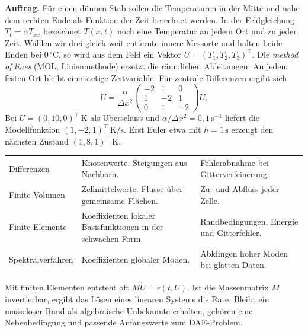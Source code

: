 \textbf{Auftrag.} Für einen dünnen Stab sollen die Temperaturen in der Mitte und nahe dem rechten Ende als Funktion der Zeit berechnet werden. In der Feldgleichung \(T_t=\alpha T_{xx}\) bezeichnet \(T(x,t)\) noch eine Temperatur an jedem Ort und zu jeder Zeit.
Wählen wir drei gleich weit entfernte innere Messorte und halten beide Enden bei \(0\,^{\circ}\mathrm C\), so wird aus dem Feld ein Vektor \(U=(T_1,T_2,T_3)^\top\). Die \emph{method of lines} (MOL, Linienmethode) ersetzt die räumlichen Ableitungen. An jedem festen Ort bleibt eine stetige Zeitvariable. Für zentrale Differenzen ergibt sich
\[
 \dot U=\frac{\alpha}{\Delta x^2}
 \begin{pmatrix}-2&1&0\\1&-2&1\\0&1&-2\end{pmatrix}U.
\]
Bei \(U=(0,10,0)^\top\,\mathrm K\) als Überschuss und \(\alpha/\Delta x^2=0{,}1\,\mathrm{s}^{-1}\) liefert die Modellfunktion \((1,-2,1)^\top\,\mathrm{K/s}\). Erst Euler etwa mit \(h=1\,\mathrm s\) erzeugt den nächsten Zustand \((1,8,1)^\top\,\mathrm K\).
{\tblstart\begin{tabularx}{\linewidth}{@{}P{27mm}YY@{}}\toprule
{}&&\\\midrule
Differenzen&Knotenwerte. Steigungen aus Nachbarn.&Fehlerabnahme bei Gitterverfeinerung.\\
Finite Volumen&Zellmittelwerte. Flüsse über gemeinsame Flächen.&Zu- und Abfluss jeder Zelle.\\
Finite Elemente&Koeffizienten lokaler Basisfunktionen in der schwachen Form.&Randbedingungen, Energie und Gitterfehler.\\
Spektralverfahren&Koeffizienten globaler Moden.&Abklingen hoher Moden bei glatten Daten.\\\bottomrule
\end{tabularx}\par}
Mit finiten Elementen entsteht oft \(M\dot U=r(t,U)\). Ist die Massenmatrix \(M\) invertierbar, ergibt das Lösen eines linearen Systems die Rate. Bleibt ein masseloser Rand als algebraische Unbekannte erhalten, gehören eine Nebenbedingung und passende Anfangswerte zum DAE-Problem.

